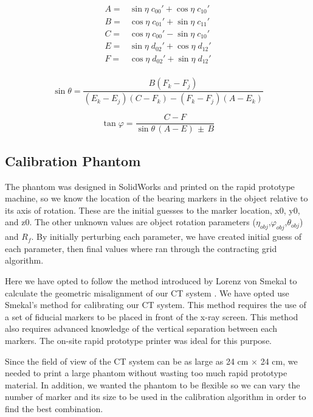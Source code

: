 \begin{equation}
\label{eq:ABCEF}
\begin{split}
A =& \sin \eta \; c_{00}' + \cos \eta \; c_{10}' \\
B =& \cos \eta \; c_{01}' + \sin \eta \; c_{11}' \\
C =& \cos \eta \; c_{00}' - \sin \eta \; c_{10}' \\
E =& \sin \eta \; d_{02}' + \cos \eta \; d_{12}' \\
F =& \cos \eta \; d_{02}' + \sin \eta \; d_{12}' \\
\end{split}
\end{equation}

\begin{equation}
\label{eq:theta}
\sin \theta = \frac{B (F_k - F_j)}{(E_k - E_j)(C - F_k)-(F_k - F_j)(A - E_k)}
\end{equation}

\begin{equation}
\label{eq:varphi}
\tan \varphi = \frac{C-F}{\sin \theta \, (A-E) \, \pm \, B}
\end{equation}

\subsection{Calibration Phantom}

The phantom was designed in SolidWorks and printed on the rapid prototype machine, so we know the location of the bearing markers in the object relative to its axis of rotation.  These are the initial guesses to the marker location, x0, y0, and z0.  The other unknown values are object rotation parameters ($\eta_{obj}$,$\varphi_{obj}$,$\theta_{obj}$) and $R_f$.  By initially perturbing each parameter, we have created initial guess of each parameter, then final values where ran through the contracting grid algorithm.

Here we have opted to follow the method introduced by Lorenz von Smekal to calculate the geometric misalignment of our CT system \cite{Smekal2004}. 
We have opted use Smekal's method for calibrating our CT system.  This method requires the use of a set of fiducial markers to be placed in front of the x-ray screen.  This method also requires advanced knowledge of the vertical separation between each markers.  The on-site rapid prototype printer was ideal for this purpose.

Since the field of view of the CT system can be as large as 24 cm $\times$ 24 cm, we needed to print a large phantom without wasting too much rapid prototype material.  In addition, we wanted the phantom to be flexible so we can vary the number of marker and its size to be used in the calibration algorithm in order to find the best combination.

